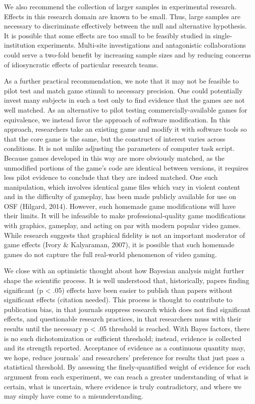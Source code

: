 \documentclass{article}
\begin{document}
We also recommend the collection of larger samples in experimental research. Effects in this research domain are known to be small. Thus, large samples are necessary to discriminate effectively between the null and alternative hypothesis. It is possible that some effects are too small to be feasibly studied in single-institution experiments. Multi-site investigations and antagonistic collaborations could serve a two-fold benefit by increasing sample sizes and by reducing concerns of idiosyncratic effects of particular research teams.

As a further practical recommendation, we note that it may not be feasible to pilot test and match game stimuli to necessary precision. One could potentially invest many subjects in such a test only to find evidence that the games are not well matched. As an alternative to pilot testing commercially-available games for equivalence, we instead favor the approach of software modification. In this approach, researchers take an existing game and modify it with software tools so that the core game is the same, but the construct of interest varies across conditions. It is not unlike adjusting the parameters of computer task script. Because games developed in this way are more obviously matched, as the unmodified portions of the game’s code are identical between versions, it requires less pilot evidence to conclude that they are indeed matched. One such manipulation, which involves identical game files which vary in violent content and in the difficulty of gameplay, has been made publicly available for use on OSF (Hilgard, 2014). However, such homemade game modifications will have their limits. It will be infeasible to make professional-quality game modifications with graphics, gameplay, and acting on par with modern popular video games. While research suggests that graphical fidelity is not an important moderator of game effects (Ivory \& Kalyaraman, 2007), it is possible that such homemade games do not capture the full real-world phenomenon of video gaming.

We close with an optimistic thought about how Bayesian analysis might further shape the scientific process. It is well understood that, historically, papers finding significant (p < .05) effects have been easier to publish than papers without significant effects (citation needed). This process is thought to contribute to publication bias, in that journals suppress research which does not find significant effects, and questionable research practices, in that researchers muss with their results until the necessary p < .05 threshold is reached. With Bayes factors, there is no such dichotomization or sufficient threshold; instead, evidence is collected and its strength reported. Acceptance of evidence as a continuous quantity may, we hope, reduce journals’ and researchers’ preference for results that just pass a statistical threshold. By assessing the finely-quantified weight of evidence for each argument from each experiment, we can reach a greater understanding of what is certain, what is uncertain, where evidence is truly contradictory, and where we may simply have come to a misunderstanding.
\end{document}
